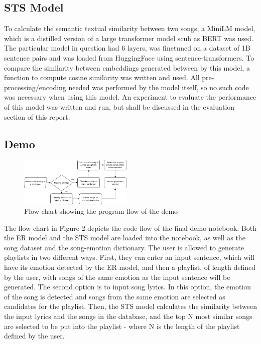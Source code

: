 \documentclass[11pt]{article}
\begin{document}
\subsection{STS Model}

To calculate the semantic textual similarity between two songs, a MiniLM \cite{minilm} model, which is a distilled version of a large transformer model scuh as BERT \cite{bert} was used. The particular model in question had 6 layers, was finetuned on a dataset of 1B sentence pairs and was loaded from HuggingFace \cite{stsmodel} using sentence-transformers. To compare the similarity between embeddings generated between by this model, a function to compute cosine similarity was written and used. All pre-processing/encoding needed was performed by the model itself, so no such code was necessary when using this model. 
An experiment to evaluate the performance of this model was written and run, but shall be discussed in the evaluation section of this report.

\subsection{Demo}
\begin{figure}[H]
    \centering
    \includegraphics[width=0.48\textwidth]{images/DemoFlow.png}
    \caption{Flow chart showing the program flow of the demo}
\end{figure}

The flow chart in Figure 2 depicts the code flow of the final demo notebook. Both the ER model and the STS model are loaded into the notebook, as well as the song dataset and the song-emotion dictionary. The user is allowed to generate playlists in two different ways. First, they can enter an input sentence, which will have its emotion detected by the ER model, and then a playlist, of length defined by the user, with songs of the same emotion as the input sentence will be generated. The second option is to input song lyrics. In this option, the emotion of the song is detected and songs from the same emotion are selected as candidates for the playlist. Then, the STS model calculates the similarity between the input lyrics and the songs in the database, and the top N most similar songs are selected to be put into the playlist - where N is the length of the playlist defined by the user.
\end{document}
